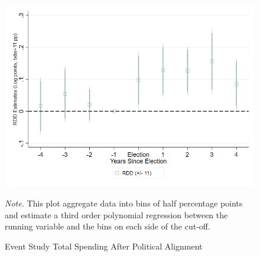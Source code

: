 \documentclass[dv_diss_main.tex]{subfiles}
\begin{document}
\newpage

\begin{figure}[h]
	\begin{center}
	    \includegraphics[width=0.8\linewidth]{figures/sdevent_itt_rdd_pf_1_0_0_ln_bd_11_th1.png}
	    \caption{Event Study Total Spending After Political Alignment}
	\end{center}
	 
	 \vspace{0.5em}
    \begin{figurenotes}
    {\footnotesize	
	\textit{Note. }This plot aggregate data into bins of half percentage points and estimate a third order polynomial regression between the running variable and the bins on each side of the cut-off. }
	\end{figurenotes}

\end{figure}

\newpage
\end{document}
